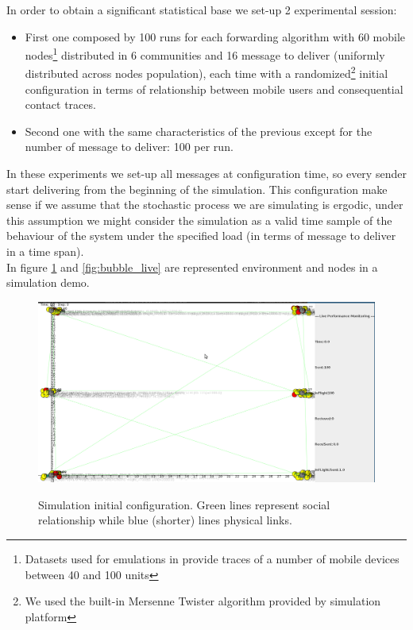 In order to obtain a significant statistical base we set-up 2 experimental session:
\begin{itemize}
\item First one composed by 100 runs for each forwarding algorithm with 60 mobile nodes\footnote{Datasets used for emulations in\cite{bubble} provide traces of a number of mobile devices between 40 and 100 units} distributed in 6 communities and 16 message to deliver (uniformly distributed across nodes population), each time with a randomized\footnote{We used the built-in Mersenne Twister algorithm provided by simulation platform} initial configuration in terms of relationship between mobile users and consequential contact traces.
\item Second one with the same characteristics of the previous except for the number of message to deliver: 100 per run. 
\end{itemize} 
In these experiments we set-up all messages at configuration time, so every sender start delivering from the beginning of the simulation. This configuration make sense if we assume that the stochastic process we are simulating is ergodic, under this assumption we might consider the simulation as a valid time sample of the behaviour of the system under the specified load (in terms of message to deliver in a time span).\\
In figure \ref{fig:bubble_live_init} and \ref{fig:bubble_live} are represented environment and nodes in a simulation demo.
\begin{figure}[h!]
	\begin{center}
    \includegraphics[scale=0.25]{img/bubble_live_init.png}
    \label{fig:bubble_live_init}
    \caption{Simulation initial configuration. Green lines represent social relationship while blue (shorter) lines physical links.}
  \end{center}
\end{figure}

